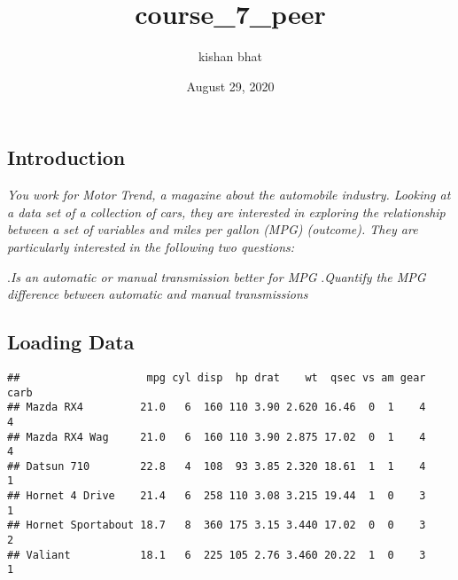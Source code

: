 \documentclass[]{article}
\title{course\_7\_peer}
\author{kishan bhat}
\date{August 29, 2020}
\begin{document}
\maketitle

\subsection{\texorpdfstring{\textbf{Introduction}}{Introduction}}\label{introduction}

\emph{You work for Motor Trend, a magazine about the automobile
industry. Looking at a data set of a collection of cars, they are
interested in exploring the relationship between a set of variables and
miles per gallon (MPG) (outcome). They are particularly interested in
the following two questions:}

.\emph{Is an automatic or manual transmission better for MPG}
.\emph{Quantify the MPG difference between automatic and manual
transmissions}

\subsection{Loading Data}\label{loading-data}

\begin{verbatim}
##                    mpg cyl disp  hp drat    wt  qsec vs am gear carb
## Mazda RX4         21.0   6  160 110 3.90 2.620 16.46  0  1    4    4
## Mazda RX4 Wag     21.0   6  160 110 3.90 2.875 17.02  0  1    4    4
## Datsun 710        22.8   4  108  93 3.85 2.320 18.61  1  1    4    1
## Hornet 4 Drive    21.4   6  258 110 3.08 3.215 19.44  1  0    3    1
## Hornet Sportabout 18.7   8  360 175 3.15 3.440 17.02  0  0    3    2
## Valiant           18.1   6  225 105 2.76 3.460 20.22  1  0    3    1
\end{verbatim}
\end{document}
